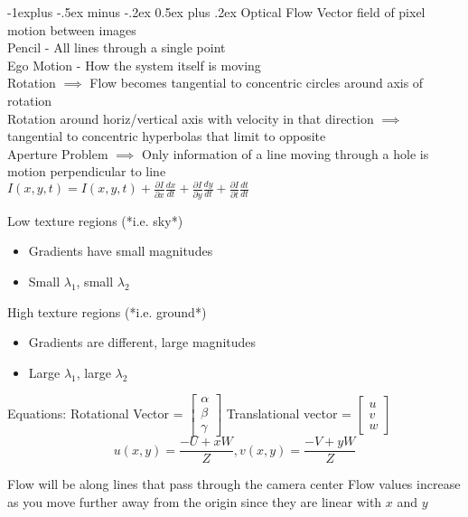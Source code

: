 \documentclass[10pt,landscape]{article}
\makeatletter
\renewcommand{\subsection}{\@startsection{subsection}{2}{0mm}%
                                {-1explus -.5ex minus -.2ex}%
                                {0.5ex plus .2ex}%
                                {\normalfont\normalsize\bfseries}}
\makeatother
\begin{document}
\begin{multicols}{3}
\subsection{Optical Flow}
Vector field of pixel motion between images \\
Pencil - All lines through a single point \\
Ego Motion - How the system itself is moving \\
Rotation $\implies$ Flow becomes tangential to concentric circles around axis of rotation \\
Rotation around horiz/vertical axis with velocity in that direction $\implies$ tangential to concentric hyperbolas that limit to opposite \\
Aperture Problem $\implies$ Only information of a line moving through a hole is motion perpendicular to line \\
$I(x,y,t) = I(x,y,t) + \frac{\partial{I}}{\partial{x}} \frac{dx}{dt} + \frac{\partial{I}}{\partial{y}} \frac{dy}{dt} + \frac{\partial{I}}{\partial{t}} \frac{dt}{dt} $

Low texture regions (*i.e. sky*)
\begin{itemize}
        \item Gradients have small magnitudes 
        \item Small $\lambda_1$, small $\lambda_2$
\end{itemize}
High texture regions (*i.e. ground*)
\begin{itemize}
        \item Gradients are different, large magnitudes
        \item Large $\lambda_1$, large $\lambda_2$
\end{itemize}
Equations:
Rotational Vector = $\begin{bmatrix} \alpha \\ \beta \\ \gamma \end{bmatrix}$    Translational vector = $\begin{bmatrix} u \\ v \\ w \end{bmatrix}$
$$
u(x,y) = \frac{-U + xW}{Z},
v(x,y) = \frac{-V + yW}{Z} 
$$

Flow will be along lines that pass through the camera center
Flow values increase as you move further away from the origin since they are linear with $x$ and $y$ \\


\end{multicols}
\end{document}
